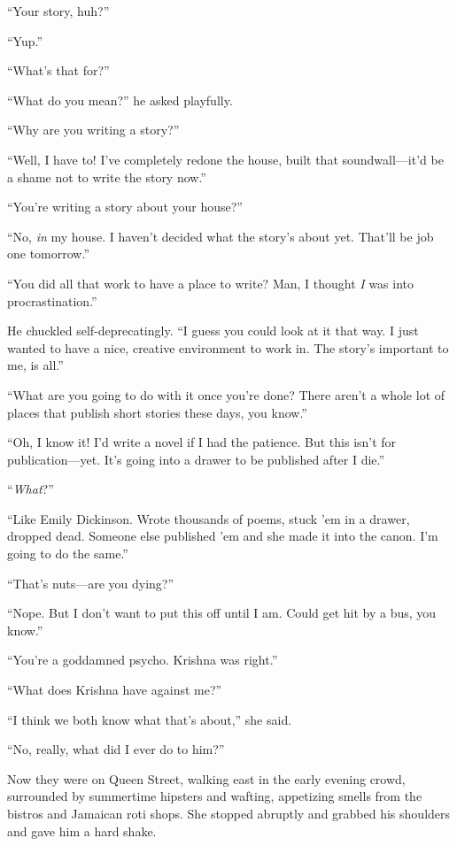 ``Your story, huh?''

``Yup.''

``What's that for?''

``What do you mean?'' he asked playfully.

``Why are you writing a story?''

``Well, I have to!  I've completely redone the house, built that
soundwall---it'd be a shame not to write the story now.''

``You're writing a story about your house?''

``No, \textit{in} my house.  I haven't decided what the story's about
yet.  That'll be job one tomorrow.''

``You did all that work to have a place to write?  Man, I thought
\textit{I} was into procrastination.''

He chuckled self-deprecatingly.  ``I guess you could look at it that
way.  I just wanted to have a nice, creative environment to work in. 
The story's important to me, is all.''

``What are you going to do with it once you're done?  There aren't a
whole lot of places that publish short stories these days, you know.''

``Oh, I know it!  I'd write a novel if I had the patience.  But this
isn't for publication---yet.  It's going into a drawer to be published
after I die.''

``\textit{What}?''

``Like Emily Dickinson.  Wrote thousands of poems, stuck 'em in a
drawer, dropped dead.  Someone else published 'em and she made it into
the canon.  I'm going to do the same.''

``That's nuts---are you dying?''

``Nope.  But I don't want to put this off until I am.  Could get hit
by a bus, you know.''

``You're a goddamned psycho.  Krishna was right.''

``What does Krishna have against me?''

``I think we both know what that's about,'' she said.

``No, really, what did I ever do to him?''

Now they were on Queen Street, walking east in the early evening
crowd, surrounded by summertime hipsters and wafting, appetizing
smells from the bistros and Jamaican roti shops.  She stopped abruptly
and grabbed his shoulders and gave him a hard shake.


